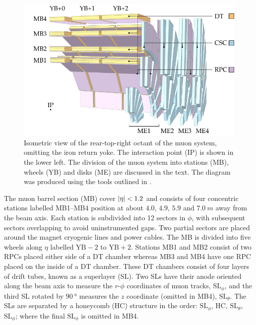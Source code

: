 \begin{figure}[htb]
    \centering
    \includegraphics{diagrams/tikz/cms/annotated/cms_muon.pdf}
    \caption[Isometric view of an octant of the CMS muon systems.]{
        Isometric view of the rear-top-right octant of the muon system,
        omitting the iron return yoke. The interaction point (IP) is shown in
        the lower left. The division of the muon system into stations (MB),
        wheels (YB) and disks (ME) are discussed in the text. The diagram was
        produced using the tools outlined in \cite{Sakuma:2013jqa}.
    }
    \label{fig:cms-muon}
\end{figure}

The muon barrel section (MB) cover ${|\eta|<1.2}$ and consists of four concentric stations labelled MB1--MB4 position at about $4.0$, $4.9$, $5.9$ and ${\SI{7.0}{m}}$ away from the beam axis. Each station is subdivided into 12 sectors in $\phi$, with subsequent sectors overlapping to avoid uninstrumented gaps. Two partial sectors are placed around the magnet cryogenic lines and power cables. The MB is divided into five wheels along $\eta$ labelled $\mathrm{YB}-2$ to $\mathrm{YB}+2$. Stations MB1 and MB2 consist of two RPCs placed either side of a DT chamber whereas MB3 and MB4 have one RPC placed on the inside of a DT chamber. These DT chambers consist of four layers of drift tubes, known as a superlayer (SL). Two SLs have their anode oriented along the beam axis to measure the $r$-$\phi$ coordinates of muon tracks, $\mathrm{SL}_{\phi}$, and the third SL rotated by ${\SI{90}{\degree}}$ measures the $z$ coordinate (omitted in MB4), $\mathrm{SL}_{\theta}$. The SLs are separated by a honeycomb (HC) structure in the order: $\mathrm{SL}_{\phi}$, HC, $\mathrm{SL}_{\theta}$, $\mathrm{SL}_{\phi}$; where the final $\mathrm{SL}_{\phi}$ is omitted in MB4.

